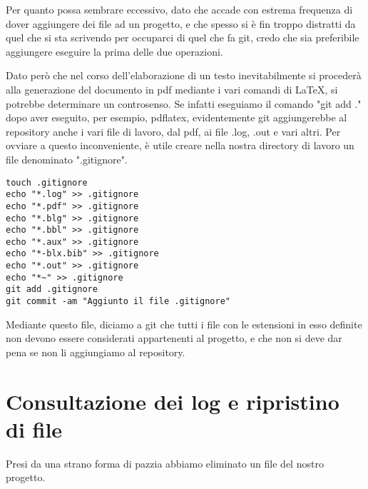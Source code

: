 \documentclass{article}
\begin{document}
Per quanto possa sembrare eccessivo, dato che accade con estrema frequenza di
dover aggiungere dei file ad un progetto, e che spesso si è fin troppo
distratti da quel che si sta scrivendo per occuparci di quel che fa git, credo
che sia preferibile aggiungere eseguire la prima delle due operazioni.

Dato però che nel corso dell'elaborazione di un testo inevitabilmente si
procederà alla generazione del documento in pdf mediante i vari comandi di
\LaTeX, si potrebbe determinare un controsenso. Se infatti eseguiamo il comando
"git add ." dopo aver eseguito,
per esempio, pdflatex, evidentemente git aggiungerebbe al repository anche i
vari file di lavoro, dal pdf, ai file .log, .out e vari altri.
Per ovviare a questo inconveniente, è utile creare nella nostra directory di
lavoro un file denominato ".gitignore".

\begin{framed}
\begin{lstlisting}
touch .gitignore
echo "*.log" >> .gitignore
echo "*.pdf" >> .gitignore
echo "*.blg" >> .gitignore
echo "*.bbl" >> .gitignore
echo "*.aux" >> .gitignore
echo "*-blx.bib" >> .gitignore
echo "*.out" >> .gitignore
echo "*~" >> .gitignore
git add .gitignore
git commit -am "Aggiunto il file .gitignore"
\end{lstlisting}
\end{framed}

Mediante questo file, diciamo a git che tutti i file con le estensioni in esso
definite non devono essere considerati appartenenti al progetto, e che non si
deve dar pena se non li aggiungiamo al repository.

\section{Consultazione dei log e ripristino di file}
Presi da una strano forma di pazzia abbiamo eliminato un file del nostro
progetto.
\end{document}
